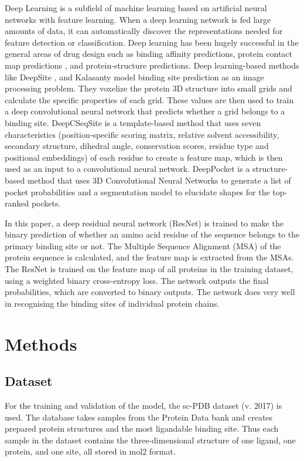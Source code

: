 \documentclass[journal=jacsat,manuscript=article]{achemso}
\begin{document}
Deep Learning is a subfield of machine learning based on artificial neural networks with feature learning. When a deep learning network is fed large amounts of data, it can automatically discover the representations needed for feature detection or classification. Deep learning has been hugely successful in the general areas of drug design such as binding affinity predictions\cite{jimenez2018k,ozturk2018deepdta}, protein contact map predictions \cite{hanson2018accurate,wang2017accurate}, and protein-structure predictions\cite{senior2020improved,li2019ensembling,tiwari2020network}. Deep learning-based methods like DeepSite \cite{jimenez2017deepsite}, and Kalasanty \cite{stepniewska2020improving} model binding site prediction as an image processing problem. They voxelize the protein 3D structure into small grids and calculate the specific properties of each grid. These values are then used to train a deep convolutional neural network that predicts whether a grid belongs to a binding site. DeepCSeqSite \cite{cui2019predicting} is a template-based method that uses seven characteristics (position-specific scoring matrix, relative solvent accessibility, secondary structure, dihedral angle, conservation scores, residue type and positional embeddings) of each residue to create a feature map, which is then used as an input to a convolutional neural network. DeepPocket \cite{aggarwal2021deeppocket} is a structure-based method that uses 3D Convolutional Neural Networks to generate a list of pocket probabilities and a segmentation model to elucidate shapes for the top-ranked pockets.

In this paper, a deep residual neural network (ResNet)\cite{he2016deep} is trained to make the binary prediction of whether an amino acid residue of the sequence belongs to the primary binding site or not. The Multiple Sequence Alignment (MSA) of the protein sequence is calculated, and the feature map is extracted from the MSAs. The ResNet is trained on the feature map of all proteins in the training dataset, using a weighted binary cross-entropy loss. The network outputs the final probabilities, which are converted to binary outputs. The network does very well in recognising the binding sites of individual protein chains.

\section{Methods}
\subsection{Dataset}
\quad For the training and validation of the model, the sc-PDB\cite{desaphy2015sc} dataset (v. 2017) is used. The database takes samples from the Protein Data bank\cite{berman2000protein,berman2003announcing} and creates prepared protein structures and the most ligandable binding site. Thus each sample in the dataset contains the three-dimensional structure of one ligand, one protein, and one site, all stored in mol2 format.
\end{document}
